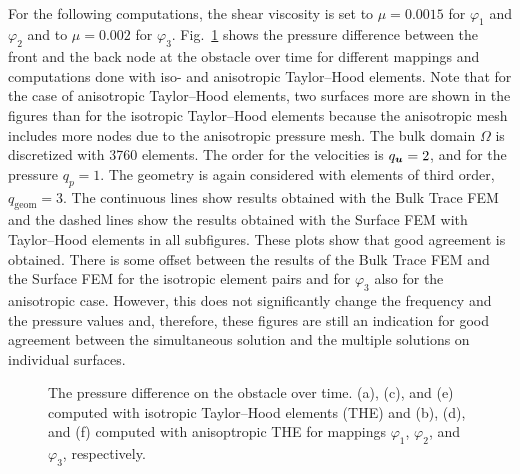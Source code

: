 \documentclass[12pt, twoside, english]{article}
\numberwithin{equation}{section}
\newcommand{\vek}[1]{\mathchoice{\displaystyle\boldsymbol#1}
{\textstyle\boldsymbol#1}{\scriptstyle\boldsymbol#1}
{\scriptscriptstyle\boldsymbol#1}}
\begin{document}
\\
For the following computations, the shear viscosity is set to $\mu = 0.0015$ for $\varphi_1$ and $\varphi_2$ and to $\mu = 0.002$ for $\varphi_3$. Fig.~\ref{fig:TurekInstatNSEQ-ResPD} shows the pressure difference between the front and the back node at the obstacle over time for different mappings and computations done with iso- and anisotropic Taylor--Hood elements. Note that for the case of anisotropic Taylor--Hood elements, two surfaces more are shown in the figures than for the isotropic Taylor--Hood elements because the anisotropic mesh includes more nodes due to the anisotropic pressure mesh. The bulk domain $\Omega$ is discretized with 3760 elements. The order for the velocities is $q_{\vek{u}} = 2$, and for the pressure $q_{p} = 1$. The geometry is again considered with elements of third order, $q_{\mathrm{geom}} = 3$. The continuous lines show results obtained with the Bulk Trace FEM and the dashed lines show the results obtained with the Surface FEM with Taylor--Hood elements in all subfigures. These plots show that good agreement is obtained. There is some offset between the results of the Bulk Trace FEM and the Surface FEM for the isotropic element pairs and for $\varphi_3$ also for the anisotropic case. However, this does not significantly change the frequency and the pressure values and, therefore, these figures are still an indication for good agreement between the simultaneous solution and the multiple solutions on individual surfaces.
\begin{figure}
	\centering
	
	\hspace{0.1\textwidth}
	\hspace{0.1\textwidth}
	\hspace{0.1\textwidth}
	
	\caption{\label{fig:TurekInstatNSEQ-ResPD} The pressure difference on the obstacle over time. (a), (c), and (e) computed with isotropic Taylor--Hood elements (THE) and (b), (d), and (f) computed with anisoptropic THE for mappings $\varphi_1$, $\varphi_2$, and $\varphi_3$, respectively.}
\end{figure}
\end{document}
